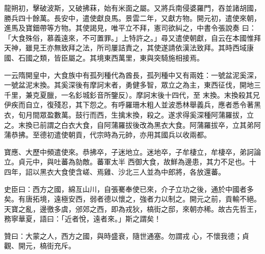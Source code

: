 \begin{pinyinscope}
 龍朔初，擊破波斯，又破拂菻，始有米面之屬。又將兵南侵婆羅門，吞並諸胡國，勝兵四十餘萬。長安中，遣使獻良馬。景雲二年，又獻方物。開元初，遣使來朝，進馬及寶鈿帶等方物。其使謁見，唯平立不拜，憲司欲糾之，中書令張說奏
 曰：「大食殊俗，慕義遠來，不可置罪。」上特許之。」尋又遣使朝獻，自云在本國惟拜天神，雖見王亦無致拜之法，所司屢詰責之，其使遂請依漢法致拜。其時西域康國、石國之類，皆臣屬之。其境東西萬里，東與突騎施相接焉。



 一云隋開皇中，大食族中有孤列種代為酋長，孤列種中又有兩姓：一號盆泥奚深，一號盆泥末換。其奚深後有摩訶末者，勇健多智，眾立之為主，東西征伐，開地三千里，兼克夏臘，一名釤城釤音所鑒反）。摩訶末後十四代，至
 末換。末換殺其兄伊疾而自立，復殘忍，其下怨之。有呼羅珊木粗人並波悉林舉義兵，應者悉令著黑衣，旬月間眾盈數萬。鼓行而西，生擒末換，殺之。遂求得奚深種阿蒲羅拔，立之。末換已前謂之白衣大食，自阿蒲羅拔後改為黑衣大食。阿蒲羅拔卒，立其弟阿蒲恭拂。至德初遣使朝貢，代宗時為元帥，亦用其國兵以收兩都。



 寶應、大歷中頻遣使來。恭拂卒，子迷地立。迷地卒，子牟棲立，牟棲卒，弟訶論立。貞元中，與吐蕃為勍敵。蕃軍太半
 西御大食，故鮮為邊患，其力不足也。十四年，詔以黑衣大食使含嵯、焉雞、沙北三人並為中郎將，各放還蕃。



 史臣曰：西方之國，綿亙山川，自張騫奉使已來，介子立功之後，通於中國者多矣。有唐拓境，遠極安西，弱者德以懷之，強者力以制之。開元之前，貢輸不絕。天寶之亂，邊徼多虞，邠郊之西，即為戎狄，槁街之邸，來朝亦稀。故古先哲王，務寧華夏，語曰：「近者悅，遠者來。」斯之謂矣！



 贊曰：大蒙之人，西方之國，與時盛衰，隨世通塞。勿謂戎
 心，不懷我德；貞觀、開元，槁街充斥。



\end{pinyinscope}